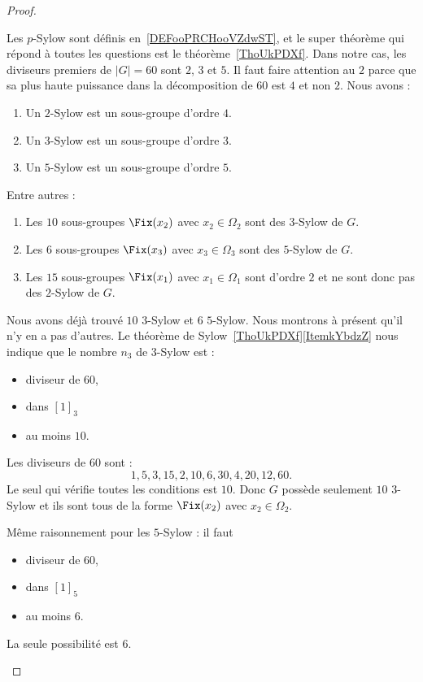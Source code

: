 \begin{proof}
\begin{subproof}
		Les \( p\)-Sylow sont définis en~\ref{DEFooPRCHooVZdwST}, et le super théorème qui répond à toutes les questions est le théorème~\ref{ThoUkPDXf}. Dans notre cas, les diviseurs premiers de \( | G |=60\) sont \( 2\), \( 3\) et \( 5\). Il faut faire attention au \( 2\) parce que sa plus haute puissance dans la décomposition de \( 60\) est \( 4\) et non \( 2\). Nous avons :
		\begin{enumerate}
			\item
			      Un \( 2\)-Sylow est un sous-groupe d'ordre \( 4\).
			\item
			      Un \( 3\)-Sylow est un sous-groupe d'ordre \( 3\).
			\item
			      Un \( 5\)-Sylow est un sous-groupe d'ordre \( 5\).
		\end{enumerate}
		Entre autres :
		\begin{enumerate}
			\item
			      Les \( 10\) sous-groupes \( \Fix(x_2)\) avec \( x_2\in \Omega_2\) sont des \( 3\)-Sylow de \( G\).
			\item
			      Les \( 6\) sous-groupes \( \Fix(x_3)\) avec \( x_3\in \Omega_3\) sont des \( 5\)-Sylow de \( G\).
			\item
			      Les \( 15\) sous-groupes \( \Fix(x_1)\) avec \( x_1\in \Omega_1\) sont d'ordre \( 2\) et ne sont donc pas des \( 2\)-Sylow de \( G\).
		\end{enumerate}

		Nous avons déjà trouvé \( 10\) \( 3\)-Sylow et \( 6\) \( 5\)-Sylow. Nous montrons à présent qu'il n'y en a pas d'autres. Le théorème de Sylow~\ref{ThoUkPDXf}\ref{ItemkYbdzZ} nous indique que le nombre \( n_3\) de \( 3\)-Sylow est :
		\begin{itemize}
			\item diviseur de \( 60\),
			\item dans \( [1]_3\)
			\item au moins \( 10\).
		\end{itemize}
		Les diviseurs de \( 60\) sont :
		\begin{equation}
			1,5,3,15,2,10,6,30,4,20,12,60.
		\end{equation}
		Le seul qui vérifie toutes les conditions est \( 10\). Donc \( G\) possède seulement \( 10\) \( 3\)-Sylow et ils sont tous de la forme \( \Fix(x_2)\) avec \( x_2\in \Omega_2\).

		Même raisonnement pour les \( 5\)-Sylow : il faut
		\begin{itemize}
			\item diviseur de \( 60\),
			\item dans \( [1]_5\)
			\item au moins \( 6\).
		\end{itemize}
		La seule possibilité est \( 6\).


\end{subproof}
\end{proof}
